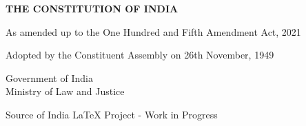 \documentclass[a4paper,showamendments]{soi}
\begin{document}
\begin{titlepage}
    \centering
    \vspace*{2cm}
    
    {\Huge\bfseries THE CONSTITUTION OF INDIA}
    
    \vspace{1cm}
    {\Large As amended up to the One Hundred and Fifth Amendment Act, 2021}
    
    \vspace{2cm}
    {\large Adopted by the Constituent Assembly on 26th November, 1949}
    
    \vfill
    
    {\large Government of India\\Ministry of Law and Justice}
    
    \vspace{1cm}
    {\normalsize Source of India LaTeX Project - Work in Progress}
\end{titlepage}



% 








\clearpage
\end{document}

